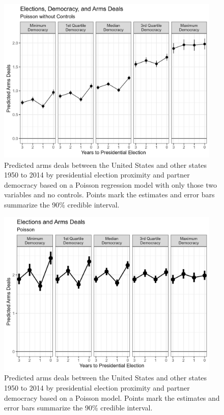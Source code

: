 \documentclass[12pt]{article}
\begin{document}
\begin{figure}[htpb]
	\centering
		\includegraphics[width=0.95\textwidth]{nocont-deals-pred.png}
	\caption{Predicted arms deals between the United States and other states 1950 to 2014 by presidential election proximity and partner democracy based on a Poisson regression model with only those two variables and no controls. Points mark the estimates and error bars summarize the 90\% credible interval.}
	\label{fig:deals-pred-nocont}
\end{figure}



\begin{figure}[htpb]
	\centering
		\includegraphics[width=0.95\textwidth]{deals-pred-pois.png}
	\caption{Predicted arms deals between the United States and other states 1950 to 2014 by presidential election proximity and partner democracy based on a Poisson model. Points mark the estimates and error bars summarize the 90\% credible interval.}
	\label{fig:deals-pred-pois}
\end{figure}
\end{document}
